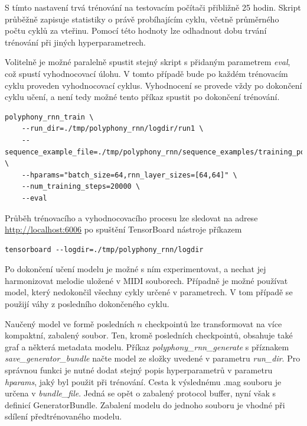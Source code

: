 S tímto nastavení trvá trénování na testovacím počítači přibližně 25 hodin.
Skript průběžně zapisuje statistiky o právě probíhajícím cyklu, 
včetně průměrného počtu cyklů za vteřinu.
Pomocí této hodnoty lze odhadnout dobu trvání trénování při jiných hyperparametrech.


\par

Volitelně je možné paralelně spustit stejný skript s přidaným parametrem \emph{eval},
což spustí vyhodnocovací úlohu.
V tomto případě bude po každém trénovacím cyklu proveden vyhodnocovací cyklus.
Vyhodnocení se provede vždy po dokončení cyklu učení, 
a není tedy možné tento příkaz spustit po dokončení trénování.
\cite{google_git_polyphony}


\begin{verbatim}
polyphony_rnn_train \
    --run_dir=./tmp/polyphony_rnn/logdir/run1 \
    --sequence_example_file=./tmp/polyphony_rnn/sequence_examples/training_poly_tracks.tfrecord \
    --hparams="batch_size=64,rnn_layer_sizes=[64,64]" \
    --num_training_steps=20000 \
    --eval
\end{verbatim}  
\par

Průběh trénovacího a vyhodnocovacího procesu lze sledovat na adrese
\url{http://localhost:6006} po spuštění TensorBoard nástroje příkazem

\begin{verbatim}
tensorboard --logdir=./tmp/polyphony_rnn/logdir   
\end{verbatim}
\par

Po dokončení učení modelu je možné s ním experimentovat, 
a nechat jej harmonizovat melodie uložené v MIDI souborech.
Případně je možné používat model, který nedokončil všechny cykly určené v parametrech.
V tom případě se použijí váhy z posledního dokončeného cyklu.
\par
Naučený model ve formě posledních $n$ checkpointů lze transformovat
na více kompaktní, zabalený soubor.
Ten, kromě posledních checkpointů, obsahuje také graf a některá metadata modelu.
Příkaz \emph{polyphony\_rnn\_generate} s příznakem \emph{save\_generator\_bundle}
načte model ze složky uvedené v parametru \emph{run\_dir}.
Pro správnou funkci je nutné dodat stejný popis hyperparametrů v parametru \emph{hparams}, 
jaký byl použit při trénování.
Cesta k výslednému .mag souboru je určena v \emph{bundle\_file}.
Jedná se opět o zabalený protocol buffer, nyní však s definicí GeneratorBundle.
Zabalení modelu do jednoho souboru je vhodné při sdílení předtrénovaného modelu.
\cite{google_git_polyphony}


